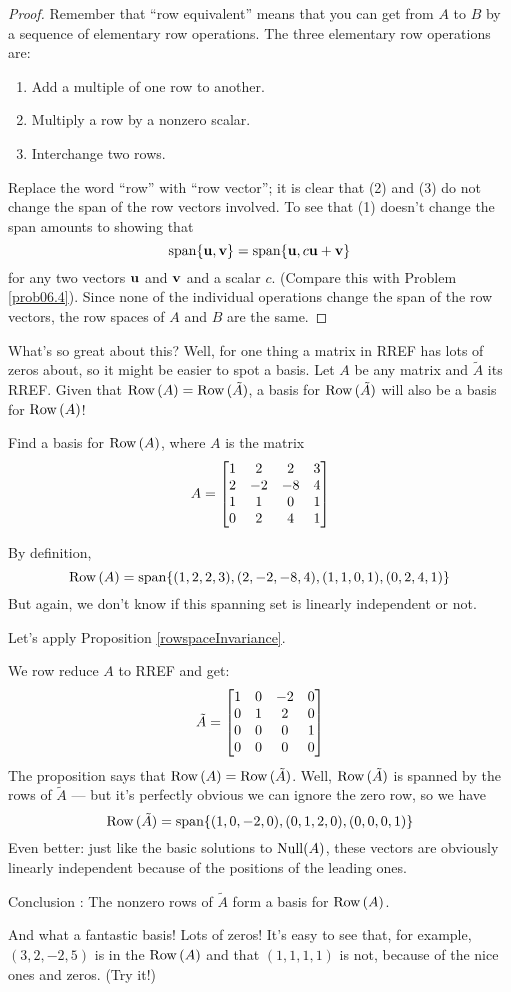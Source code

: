 \begin{proof}
Remember that ``row equivalent'' means that you can get from $A$ to
$B$ by a sequence of elementary row operations.
The three elementary row operations are:
\begin{enumerate}
\item Add a multiple of one row to another.
\item Multiply a row by a nonzero scalar.
\item Interchange two rows.
\end{enumerate}
Replace the word ``row'' with ``row vector''; it is clear that
(2) and (3) do not change the span of the row vectors involved.
To see that (1) doesn't change the span amounts to showing that
$$\textrm{span}\{\mathbf{u},\mathbf{v}\} = \textrm{span}\{ \mathbf{u}, c\mathbf{u} + \mathbf{v}\}
$$
for any two vectors $\mathbf{u}$ and $\mathbf{v}$ and a scalar $c$.  (Compare this with Problem \ref{prob06.4}).
Since none of the individual operations change the span of the
row vectors, the row spaces of $A$ and $B$ are the same.
\end{proof}

What's so great about this? Well, for one thing a matrix in RREF has lots of zeros about, so it might be easier to spot a  basis.  Let $A$ be any matrix  and $\tilde A$ its RREF. Given that $\operatorname{Row\,}(A)=\operatorname{Row\,}(\tilde A)$, a basis for $\operatorname{Row\,}(\tilde A)$ will also be a basis for $\operatorname{Row\,}(A)$!

\begin{myprob}\label{rowspace1} Find a basis for $\operatorname{Row\,}(A)$, where $A$ is the matrix
$$
A = \left[ \begin{matrix} 
1&2&2&3\\2&-2&-8&4\\1&1&0&1\\0&2&4&1 \end{matrix} \right]
$$

\begin{mysol} 
By definition, 
$$
\operatorname{Row\,}(A) = \textrm{span}\{(1,2,2,3),(2,-2,-8,4),(1,1,0,1),(0,2,4,1)\}
$$
But again, we don't know if this spanning set is linearly
independent or not.   

Let's apply  Proposition \ref{rowspaceInvariance}. 

We row reduce $A$ to RREF and get:
$$
\tilde A=\left[ \begin{matrix} 1 & 0 & -2 & 0\\ 0 & 1 & 2 & 0\\ 0 & 0 & 0 & 1\\ 0 & 0 & 0 & 0 \end{matrix} \right]
$$
The proposition says that $\operatorname{Row\,}(A) = \operatorname{Row\,}(\tilde A)$.  Well, $\operatorname{Row\,}(\tilde A)$ is
spanned by the rows of $\tilde A$ --- but it's perfectly obvious we
can ignore the zero row, so we have
$$
\operatorname{Row\,}(\tilde A) = \textrm{span}\{ (1,0,-2,0), (0,1,2,0), (0,0,0,1)\}
$$
Even better:  just like the basic solutions to $\operatorname{Null}(A)$, these
vectors are obviously linearly independent because of the positions
of the leading ones.  

Conclusion :  The nonzero rows of $\tilde A$ form a basis
for $\operatorname{Row\,}(A)$.

And what a fantastic basis!  Lots of zeros!  It's easy to see
that, for example, $(3,2,-2,5)$ is in the $\operatorname{Row\,}(A)$
and that $(1,1,1,1)$ is not, because of the nice ones and zeros.  (Try it!)
\end{mysol}\end{myprob}

